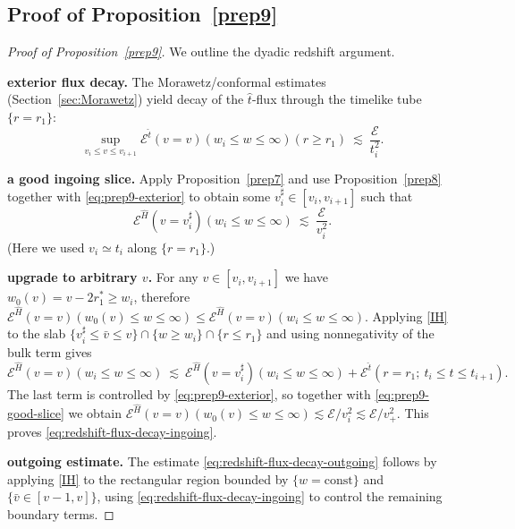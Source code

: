 \documentclass[11pt]{article}
\numberwithin{equation}{section}
\theoremstyle{plain}
\theoremstyle{definition}
\theoremstyle{remark}
\begin{document}
\subsection{Proof of Proposition~\ref{prep9}}
\label{app:proof-prep9}

\begin{proof}[Proof of Proposition~\ref{prep9}]
We outline the dyadic redshift argument.

\smallskip
\noindent\textbf{exterior flux decay.}
The Morawetz/conformal estimates (Section~\ref{sec:Morawetz}) yield decay of the $\hat t$-flux through the timelike tube $\{r=r_1\}$:
\begin{equation}\label{eq:prep9-exterior}
\sup_{v_i\le v\le v_{i+1}}\mathcal E^{\hat t}(v=v)(w_i\le w\le\infty)(r\ge r_1)
\ \lesssim\ \frac{\mathcal E}{t_{i}^{2}}.
\end{equation}

\smallskip
\noindent\textbf{a good ingoing slice.}
Apply Proposition~\ref{prep7} and use Proposition~\ref{prep8} together with \eqref{eq:prep9-exterior} to obtain some $v_{i}^{\sharp}\in[v_i,v_{i+1}]$ such that
\begin{equation}\label{eq:prep9-good-slice}
\mathcal E^{\hat H}(v=v_{i}^{\sharp})(w_i\le w\le\infty)
\ \lesssim\ \frac{\mathcal E}{v_{i}^{2}}.
\end{equation}
(Here we used $v_i\simeq t_i$ along $\{r=r_1\}$.)

\smallskip
\noindent\textbf{upgrade to arbitrary $v$.}
For any $v\in[v_i,v_{i+1}]$ we have $w_0(v)=v-2r_1^{\ast}\ge w_i$, therefore
\(
\mathcal E^{\hat H}(v=v)(w_0(v)\le w\le\infty)\le \mathcal E^{\hat H}(v=v)(w_i\le w\le\infty).
\)
Applying \eqref{IH} to the slab $\{v_{i}^{\sharp}\le \bar v\le v\}\cap\{w\ge w_i\}\cap\{r\le r_1\}$ and using nonnegativity of the bulk term gives
\begin{equation}
\mathcal E^{\hat H}(v=v)(w_i\le w\le\infty)
\ \lesssim\ \mathcal E^{\hat H}(v=v_{i}^{\sharp})(w_i\le w\le\infty)
+\mathcal E^{\hat t}(r=r_1;\ t_i\le t\le t_{i+1}).
\end{equation}
The last term is controlled by \eqref{eq:prep9-exterior}, so together with \eqref{eq:prep9-good-slice} we obtain
\(
\mathcal E^{\hat H}(v=v)(w_0(v)\le w\le\infty)\lesssim \mathcal E/v_{i}^{2}\lesssim \mathcal E/v_{+}^{2}.
\)
This proves \eqref{eq:redshift-flux-decay-ingoing}.

\smallskip
\noindent\textbf{outgoing estimate.}
The estimate \eqref{eq:redshift-flux-decay-outgoing} follows by applying \eqref{IH} to the rectangular region bounded by $\{w=\mathrm{const}\}$ and $\{\bar v\in[v-1,v]\}$, using \eqref{eq:redshift-flux-decay-ingoing} to control the remaining boundary terms.
\end{proof}
\end{document}

